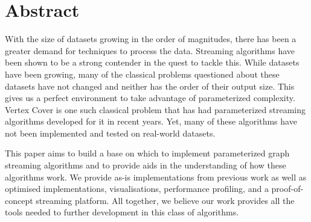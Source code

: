 \section*{Abstract}

With the size of datasets growing in the order of magnitudes, there has been a
greater demand for techniques to process the data. Streaming algorithms have
been shown to be a strong contender in the quest to tackle this. While datasets
have been growing, many of the classical problems questioned about these
datasets have not changed and neither has the order of their output size. This
gives us a perfect environment to take advantage of parameterized complexity.
Vertex Cover is one such classical problem that has had parameterized streaming
algorithms developed for it in recent years. Yet, many of these algorithms have
not been implemented and tested on real-world datasets.

This paper aims to build a base on which to implement parameterized graph
streaming algorithms and to provide aids in the understanding of how these
algorithms work. We provide as-is implementations from previous work as well as
optimised implementations, visualisations, performance profiling, and a
proof-of-concept streaming platform. All together, we believe our work provides
all the tools needed to further development in this class of algorithms.

\pagebreak
